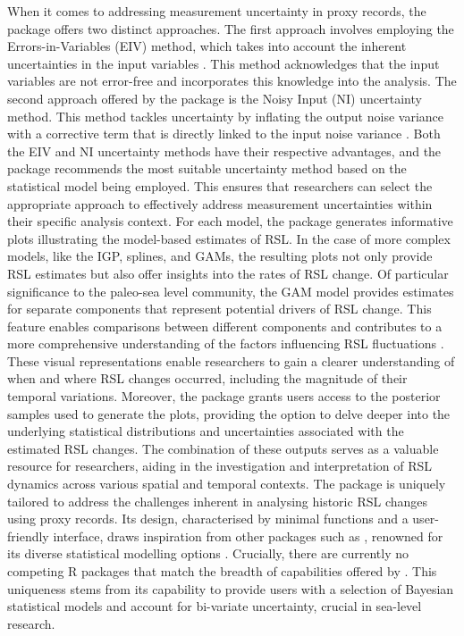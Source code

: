 When it comes to addressing measurement uncertainty in proxy records, the  package offers two distinct approaches. The first approach involves employing the Errors-in-Variables (EIV) method, which takes into account the inherent uncertainties in the input variables \citep{Dey2000}. This method acknowledges that the input variables are not error-free and incorporates this knowledge into the analysis. The second approach offered by the package is the Noisy Input (NI) uncertainty method. This method tackles uncertainty by inflating the output noise variance with a corrective term that is directly linked to the input noise variance \citep{McHutchon2011}. Both the EIV and NI uncertainty methods have their respective advantages, and the  package recommends the most suitable uncertainty method based on the statistical model being employed. This ensures that researchers can select the appropriate approach to effectively address measurement uncertainties within their specific analysis context.
For each model, the  package generates informative plots illustrating the model-based estimates of RSL. In the case of more complex models, like the IGP, splines, and GAMs, the resulting plots not only provide RSL estimates but also offer insights into the rates of RSL change. Of particular significance to the paleo-sea level community, the GAM model provides estimates for separate components that represent potential drivers of RSL change. This feature enables comparisons between different components and contributes to a more comprehensive understanding of the factors influencing RSL fluctuations \citep{Upton2023noisy}. These visual representations enable researchers to gain a clearer understanding of when and where RSL changes occurred, including the magnitude of their temporal variations. Moreover, the package grants users access to the posterior samples used to generate the plots, providing the option to delve deeper into the underlying statistical distributions and uncertainties associated with the estimated RSL changes. The combination of these outputs serves as a valuable resource for researchers, aiding in the investigation and interpretation of RSL dynamics across various spatial and temporal contexts.
The  package is uniquely tailored to address the challenges inherent in analysing historic RSL changes using proxy records. Its design, characterised by minimal functions and a user-friendly interface, draws inspiration from other packages such as , renowned for its diverse statistical modelling options \citep{wood2015package}. Crucially, there are currently no competing R packages that match the breadth of capabilities offered by . This uniqueness stems from its capability to provide users with a selection of Bayesian statistical models and account for bi-variate uncertainty, crucial in sea-level research.
